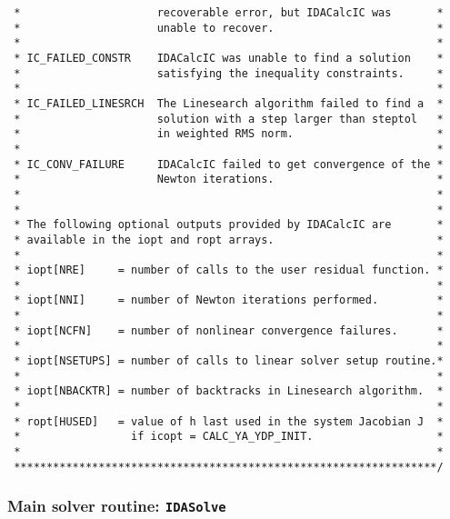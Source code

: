 \begin{verbatim}
 *                     recoverable error, but IDACalcIC was       *
 *                     unable to recover.                         *
 *                                                                *
 * IC_FAILED_CONSTR    IDACalcIC was unable to find a solution    *
 *                     satisfying the inequality constraints.     *
 *                                                                *
 * IC_FAILED_LINESRCH  The Linesearch algorithm failed to find a  *
 *                     solution with a step larger than steptol   *
 *                     in weighted RMS norm.                      *
 *                                                                *
 * IC_CONV_FAILURE     IDACalcIC failed to get convergence of the *
 *                     Newton iterations.                         *
 *                                                                *
 *                                                                *
 * The following optional outputs provided by IDACalcIC are       *
 * available in the iopt and ropt arrays.                         *
 *                                                                *
 * iopt[NRE]     = number of calls to the user residual function. *
 *                                                                *
 * iopt[NNI]     = number of Newton iterations performed.         *
 *                                                                *
 * iopt[NCFN]    = number of nonlinear convergence failures.      *
 *                                                                *
 * iopt[NSETUPS] = number of calls to linear solver setup routine.*
 *                                                                *
 * iopt[NBACKTR] = number of backtracks in Linesearch algorithm.  *
 *                                                                *
 * ropt[HUSED]   = value of h last used in the system Jacobian J  *
 *                 if icopt = CALC_YA_YDP_INIT.                   *
 *                                                                *
 *****************************************************************/

\end{verbatim}
\normalsize


\subsubsection{Main solver routine: {\tt IDASolve}}

